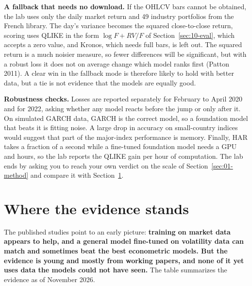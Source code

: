 \textbf{A fallback that needs no download.} If the OHLCV bars cannot be obtained, the lab uses only the daily market return and 49 industry portfolios from the French library. The day's variance becomes the squared close-to-close return, scoring uses QLIKE in the form $\log F + RV/F$ of Section~\ref{sec:10-eval}, which accepts a zero value, and Kronos, which needs full bars, is left out. The squared return is a much noisier measure, so fewer differences will be significant, but with a robust loss it does not on average change which model ranks first (Patton 2011). A clear win in the fallback mode is therefore likely to hold with better data, but a tie is not evidence that the models are equally good.


\label{sec:23-stress}
\textbf{Robustness checks.} Losses are reported separately for February to April 2020 and for 2022, asking whether any model reacts before the jump or only after it. On simulated GARCH data, GARCH is the correct model, so a foundation model that beats it is fitting noise. A large drop in accuracy on small-country indices would suggest that part of the major-index performance is memory. Finally, HAR takes a fraction of a second while a fine-tuned foundation model needs a GPU and hours, so the lab reports the QLIKE gain per hour of computation. The lab ends by asking you to reach your own verdict on the scale of Section~\ref{sec:01-method} and compare it with Section~\ref{sec:23-verdict}.

\section{Where the evidence stands}
\label{sec:23-verdict}

The published studies point to an early picture: \textbf{training on market data appears to help, and a general model fine-tuned on volatility data can match and sometimes beat the best econometric models. But the evidence is young and mostly from working papers, and none of it yet uses data the models could not have seen.} The table summarizes the evidence as of November 2026.

